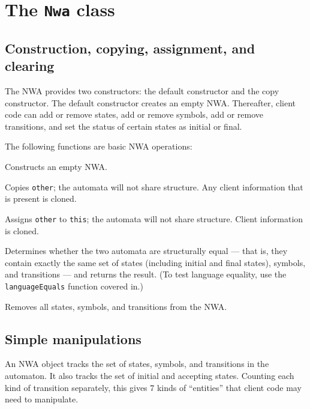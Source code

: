 \section{The \texttt{Nwa} class}
\label{Se:NWA-class}

\subsection{Construction, copying, assignment, and clearing}
\label{Se:Construction}

The NWA provides two constructors: the default constructor and the copy
constructor. The default constructor creates an empty NWA. Thereafter,
client code can add or remove states, add or remove symbols, add or remove
transitions, and set the status of certain states as initial or final.


The following functions are basic NWA operations:
\begin{functionlist}
    Constructs an empty NWA.

    Copies \texttt{other}; the
    automata will not share structure. Any client information that is present is cloned.

    Assigns \texttt{other} to \texttt{this};
    the automata will not share structure. Client information is cloned.

    Determines whether the two automata are structurally equal --- that is,
    they contain exactly the same set of states (including initial and final
    states), symbols, and transitions --- and returns the result. (To test
    language equality, use the \texttt{languageEquals} function covered
    in.)

    Removes all states, symbols, and transitions from the NWA.

\end{functionlist}


\subsection{Simple manipulations}

An NWA object tracks the set of states, symbols, and transitions in the
automaton. It also tracks the set of initial and accepting states.
Counting each kind of transition separately, this gives 7 kinds of
``entities'' that client code may need to manipulate.

